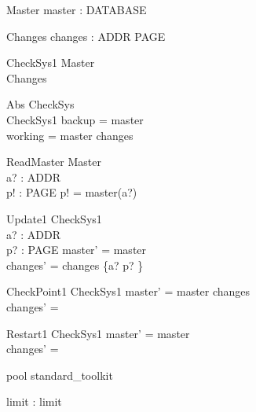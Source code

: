 \documentclass{llncs}
\begin{document}
\begin{schema}{Master}
master : DATABASE
\end{schema}

\begin{schema}{Changes}
changes : ADDR \pfun PAGE
\end{schema}

\begin{schema}{CheckSys1}
Master \\
Changes
\end{schema}

\begin{schema}{Abs}
CheckSys \\
CheckSys1
\where
backup = master \\
working = master \oplus changes
\end{schema}

\begin{schema}{ReadMaster}
\Xi Master \\
a? : ADDR \\
p! : PAGE
\where
p! = master(a?)
\end{schema}

\begin{schema}{Update1}
\Delta CheckSys1 \\
a? : ADDR \\
p? : PAGE
\where
master' = master \\
changes' = changes \oplus \{a? \mapsto p? \}
\end{schema}

\begin{schema}{CheckPoint1}
\Delta CheckSys1
\where
master' = master \oplus changes \\
changes' = \emptyset
\end{schema}

\begin{schema}{Restart1}
\Delta CheckSys1
\where master' = master \\
changes' = \emptyset
\end{schema}



\begin{zsection}
\SECTION pool \parents standard\_toolkit
\end{zsection}

\begin{axdef}
limit : \nat
\where
limit 
\end{axdef}
\end{document}
